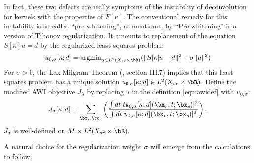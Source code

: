 In fact, these two defects are really symptoms of the instability of
deconvolution for kernels with the properties of $F[\kappa]$.  The
conventional remedy for this instability is so-called ``pre-whitening'', as
mentioned by \cite{Warner:16} ``Pre-whitening'' is a version of
Tihonov regularization. It  amounts to replacement of the equation
$S[\kappa]u=d$ by the regularized least squares problem: 
\begin{equation}
  \label{eqn:reg}
  u_{0,\sigma}[\kappa;d] = \mbox{argmin}_{u \in L^2(X_{sr} \times \bR)} (\|S[\kappa]u-d\|^2 + \sigma\|u\|^2)
\end{equation}
For $\sigma > 0$, the Lax-Milgram Theorem (\cite{Yosida}, section
III.7) implies that this least-squares problem has a unique solution
$u_{0,\sigma}[\kappa;d] \in L^2(X_{sr} \times \bR)$. Define the modified AWI objective $J_{\lambda}$ by
replacing $u$ in the definition \ref{eqn:awidef} with $u_{0,\sigma}$:
\begin{equation}
  \label{eqn:awidef}
  J_{\sigma}[\kappa;d] = \sum_{\bx_s,\bx_r} \left(\frac{\int dt |tu_{0,\sigma}[\kappa;d](\bx_r,t;\bx_s)|^2}{\int dt |u_{0,\sigma}[\kappa;d](\bx_r,t;\bx_s)|^2}\right). 
\end{equation}
$J_{\sigma}$ is well-defined on $M \times L^2(X_{sr} \times \bR)$.

A natural choice for the regularization weight $\sigma$ will emerge
from the calculations to follow.

